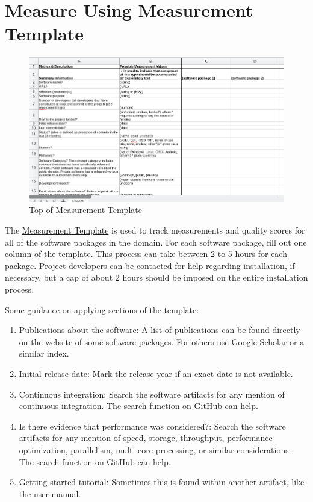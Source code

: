 \documentclass[letterpaper,cleveref]{lipics-v2019}
\theoremstyle{definition}
\begin{document}
\section{Measure Using Measurement Template} \label{SecShallowMeasure}

\begin{figure}[h!]
	\begin{center}
		\includegraphics[width=1.0\textwidth]{measurement_template}
		\caption{Top of Measurement Template}
		\label{measurement_template_image}

	\end{center}
\end{figure}

The \href{https://github.com/smiths/AIMSS/blob/master/StateOfPractice/Methodology/Combined_MeasurementTemplate_EmpiricalMeasures.xlsx}{Measurement Template} is used to track measurements and quality scores for all of the software packages in the domain. For each software package, fill out one column of the template. This process can take between 2 to 5 hours for each package.
Project developers can be contacted for help regarding installation, if necessary, but a cap of about 2 hours should be imposed on the entire installation process. 

Some guidance on applying sections of the template:

\begin{enumerate}
	\item Publications about the software: A list of publications can be found directly on the website of some software packages. For others use Google Scholar or a similar index.
	\item Initial release date: Mark the release year if an exact date is not available.
	\item Continuous integration: Search the software artifacts for any mention of continuous integration. The search function on GitHub can help. 
	\item Is there evidence that performance was considered?: Search the software artifacts for any mention of speed, storage, throughput, performance optimization, parallelism, multi-core processing, or similar considerations. The search function on GitHub can help.
	\item Getting started tutorial: Sometimes this is found within another artifact, like the user manual.
\end{enumerate}
\end{document}
